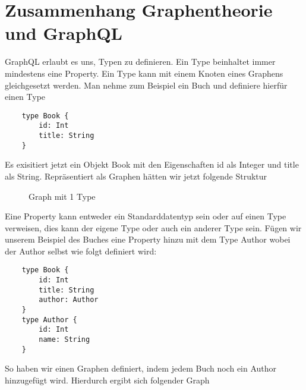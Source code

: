 \section*{Zusammenhang Graphentheorie und GraphQL}

GraphQL erlaubt es uns, Typen zu definieren. Ein Type beinhaltet immer mindestens eine Property. Ein Type kann mit einem
Knoten eines Graphens gleichgesetzt werden. Man nehme zum Beispiel ein Buch und definiere hierfür einen Type

\begin{verbatim}
    type Book {
        id: Int
        title: String
    }
\end{verbatim}

Es exisitiert jetzt ein Objekt Book mit den Eigenschaften id als Integer und title als String.
Repräsentiert als Graphen hätten wir jetzt folgende Struktur

\begin{figure}[!htbp]
    \begin{center}
    \caption{Graph mit 1 Type}
    \end{center}
    \label{fig:1type}
\end{figure}

Eine Property kann entweder ein Standarddatentyp sein oder auf einen Type verweisen, dies kann der eigene Type oder auch
ein anderer Type sein. Fügen wir unserem Beispiel des Buches eine Property hinzu mit dem Type Author wobei der Author selbst
wie folgt definiert wird:

\begin{verbatim}
    type Book {
        id: Int
        title: String
        author: Author
    }
    type Author {
        id: Int
        name: String
    }
\end{verbatim}

So haben wir einen Graphen definiert, indem jedem Buch noch ein Author hinzugefügt wird. Hierdurch ergibt sich folgender Graph

